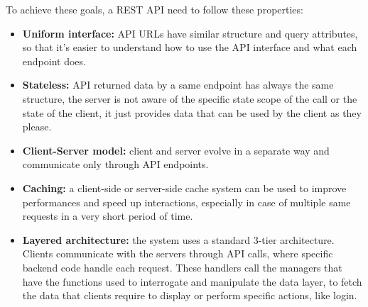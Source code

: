 To achieve these goals, a REST API need to follow these properties:
\begin{itemize}
	\item \textbf{Uniform interface:} API URLs have similar structure and query attributes, so that it's easier to understand how to use the API interface and what each endpoint does.
	\item \textbf{Stateless:} API returned data by a same endpoint has always the same structure, the server is not aware of the specific state scope of the call or the state of the client, it just provides data that can be used by the client as they please.  
	\item \textbf{Client-Server model:} client and server evolve in a separate way and communicate only through API endpoints.
	\item \textbf{Caching:} a client-side or server-side cache system can be used to improve performances and speed up interactions, especially in case of multiple same requests in a very short period of time.
	\item \textbf{Layered architecture:} the system uses a standard 3-tier architecture. Clients communicate with the servers through API calls, where specific backend code handle each request. These handlers call the managers that have the functions used to interrogate and manipulate the data layer, to fetch the data that clients require to display or perform specific actions, like login.
\end{itemize}